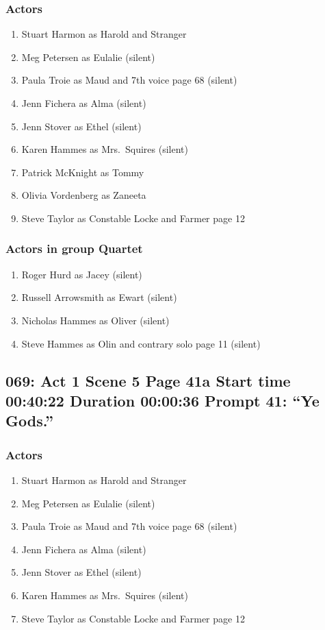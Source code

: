 \subsubsection{Actors}
\begin{enumerate}
\item Stuart Harmon as Harold and Stranger
\item Meg Petersen as Eulalie (silent)
\item Paula Troie as Maud and 7th voice page 68 (silent)
\item Jenn Fichera as Alma (silent)
\item Jenn Stover as Ethel (silent)
\item Karen Hammes as Mrs.~Squires (silent)
\item Patrick McKnight as Tommy
\item Olivia Vordenberg as Zaneeta
\item Steve Taylor as Constable Locke and Farmer page 12
\end{enumerate}
\subsubsection{Actors in group Quartet}
\begin{enumerate}
\item Roger Hurd as Jacey (silent)
\item Russell Arrowsmith as Ewart (silent)
\item Nicholas Hammes as Oliver (silent)
\item Steve Hammes as Olin and contrary solo page 11 (silent)
\end{enumerate}


\subsection{069: Act 1 Scene 5 Page 41a Start time 00:40:22 Duration 00:00:36 Prompt 41: ``Ye Gods.''}

\subsubsection{Actors}
\begin{enumerate}
\item Stuart Harmon as Harold and Stranger
\item Meg Petersen as Eulalie (silent)
\item Paula Troie as Maud and 7th voice page 68 (silent)
\item Jenn Fichera as Alma (silent)
\item Jenn Stover as Ethel (silent)
\item Karen Hammes as Mrs.~Squires (silent)
\item Steve Taylor as Constable Locke and Farmer page 12
\end{enumerate}
